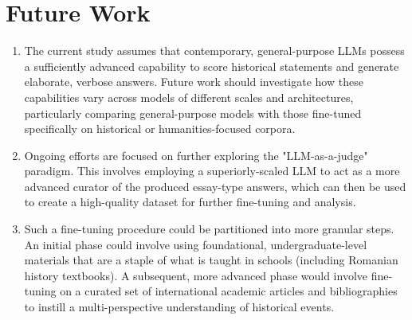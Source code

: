 \documentclass[11pt]{article}
\begin{document}
\section{Future Work}
\begin{enumerate}[label=\Alph*.]
    \item The current study assumes that contemporary, general-purpose LLMs possess a sufficiently advanced capability to score historical statements and generate elaborate, verbose answers. Future work should investigate how these capabilities vary across models of different scales and architectures, particularly comparing general-purpose models with those fine-tuned specifically on historical or humanities-focused corpora.
    \item Ongoing efforts are focused on further exploring the "LLM-as-a-judge" paradigm. This involves employing a superiorly-scaled LLM to act as a more advanced curator of the produced essay-type answers, which can then be used to create a high-quality dataset for further fine-tuning and analysis.
    \item Such a fine-tuning procedure could be partitioned into more granular steps. An initial phase could involve using foundational, undergraduate-level materials that are a staple of what is taught in schools (including Romanian history textbooks). A subsequent, more advanced phase would involve fine-tuning on a curated set of international academic articles and bibliographies to instill a multi-perspective understanding of historical events.
\end{enumerate}

\newpage
\end{document}
